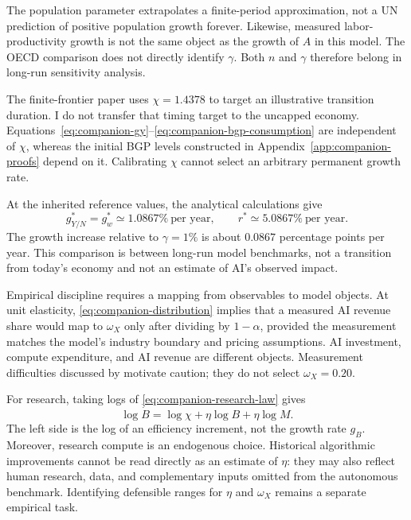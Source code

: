 The population parameter extrapolates a finite-period approximation, not a
UN prediction of positive population growth forever. Likewise, measured
labor-productivity growth is not the same object as the growth of $A$ in
this model. The OECD comparison does not directly identify $\gamma$.
Both $n$ and $\gamma$ therefore belong in long-run sensitivity analysis.

The finite-frontier paper uses $\chi=1.4378$ to target an illustrative
transition duration. I do not transfer that timing target to the uncapped
economy. Equations~\eqref{eq:companion-gy}--\eqref{eq:companion-bgp-consumption}
are independent of $\chi$, whereas the initial BGP levels constructed in
Appendix~\ref{app:companion-proofs} depend on it. Calibrating $\chi$ cannot
select an arbitrary permanent growth rate.

At the inherited reference values, the analytical calculations give
\begin{equation}
 g_{Y/N}^*=g_w^*\simeq1.0867\%\ \text{per year},\qquad
 r^*\simeq5.0867\%\ \text{per year}.
 \label{eq:companion-reference-results}
\end{equation}
The growth increase relative to $\gamma=1\%$ is about $0.0867$ percentage
points per year. This comparison is between long-run model benchmarks, not
a transition from today's economy and not an estimate of AI's observed impact.

Empirical discipline requires a mapping from observables to model objects.
At unit elasticity, \eqref{eq:companion-distribution} implies that a measured
AI revenue share would map to $\omega_X$ only after dividing by $1-\alpha$,
provided the measurement matches the model's industry boundary and pricing
assumptions. AI investment, compute expenditure, and AI revenue are different
objects. Measurement difficulties discussed by \citet{oecdaiinvestment2025}
motivate caution; they do not select $\omega_X=0.20$.

For research, taking logs of \eqref{eq:companion-research-law} gives
\begin{equation}
 \log\dot B=\log\chi+\eta\log B+\eta\log M.
 \label{eq:companion-measurement-law}
\end{equation}
The left side is the log of an efficiency increment, not the growth rate
$g_B$. Moreover, research compute is an endogenous choice. Historical
algorithmic improvements cannot be read directly as an estimate of $\eta$:
they may also reflect human research, data, and complementary inputs omitted
from the autonomous benchmark. Identifying defensible ranges for $\eta$ and
$\omega_X$ remains a separate empirical task.
